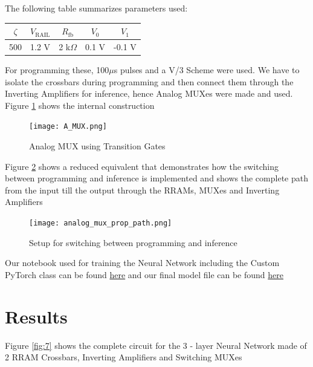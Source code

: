 \documentclass[conference]{IEEEtran}  %
\begin{document}
The following table summarizes parameters used:

\begin{table}[h]
    \centering
    \renewcommand{\arraystretch}{1.3} %
    \setlength{\tabcolsep}{4pt} %
    \begin{tabular}{|c|c|c|c|c|} \hline
         $\zeta$ & $V_{\text{RAIL}}$ & $R_{\text{fb}}$ & $V_0$ & $V_1$\\ \hline
         500 & 1.2 V & 2 k$\Omega$ & 0.1 V & -0.1 V\\ \hline
    \end{tabular}
\end{table}

For programming these, 100$\mu$s pulses and a V/3 Scheme were used. We have to isolate the crossbars during programming and then connect them through the Inverting Amplifiers for inference, hence Analog MUXes were made and used. Figure \ref{fig:5} shows the internal construction

\begin{figure}[h]
    \centering
    \texttt{[image: A\_MUX.png]}
    \caption{Analog MUX using Transition Gates}
    \label{fig:5}
\end{figure}

Figure \ref{fig:6} shows a reduced equivalent that demonstrates how the switching between programming and inference is implemented and shows the complete path from the input till the output through the RRAMs, MUXes and Inverting Amplifiers

\begin{figure}[h]
    \centering
    \texttt{[image: analog\_mux\_prop\_path.png]}
    \caption{Setup for switching between programming and inference}
    \label{fig:6}
\end{figure}

Our notebook used for training the Neural Network including the Custom PyTorch class can be found \href{https://github.com/RishiNandha/CMOS-Binary-Neural-Network/blob/main/BNN.ipynb}{here} and our final model file can be found \href{https://github.com/RishiNandha/CMOS-Binary-Neural-Network/blob/main/RRAM_model_78%25.pth}{here}

\section{Results}

Figure \ref{fig:7} shows the complete circuit for the 3 - layer Neural Network made of 2 RRAM Crossbars, Inverting Amplifiers and Switching MUXes
\end{document}

